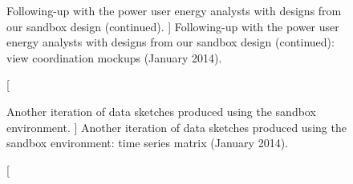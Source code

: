 

\begin{figure}
	\centering
	\caption
	[
	    Following-up with the power user energy analysts with designs from our sandbox design (continued).
	]
	{
    	Following-up with the power user energy analysts with designs from our sandbox design (continued): view coordination mockups (January 2014). 
	}
	\centering
	\label{app:emu:fig:follow-up-2}
\end{figure}



\begin{figure}
	\centering
	\caption
	[
	    Another iteration of data sketches produced using the sandbox environment.
	]
	{
    	Another iteration of data sketches produced using the sandbox environment: time series matrix (January 2014). 
	}
	\centering
	\label{app:emu:fig:sketches}
\end{figure}

